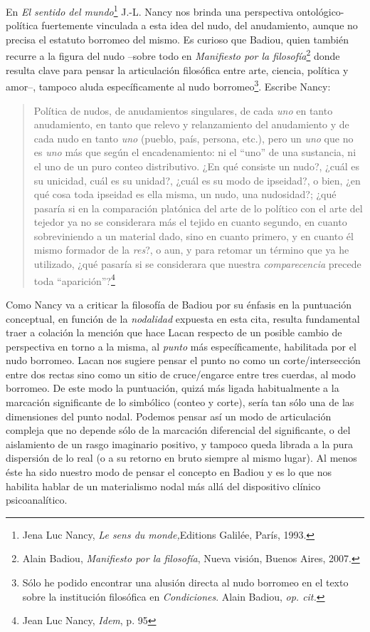 \documentclass{book}
\begin{document}
En \emph{El sentido del mundo}\footnote{Jena Luc Nancy, \emph{Le sens du
  monde,}Editions Galilée, París, 1993.} J.-L. Nancy nos brinda una
perspectiva ontológico-política fuertemente vinculada a esta idea del
nudo, del anudamiento, aunque no precisa el estatuto borromeo del mismo.
Es curioso que Badiou, quien también recurre a la figura del nudo
--sobre todo en \emph{Manifiesto por la filosofía}\footnote{Alain
  Badiou, \emph{Manifiesto por la filosofía}, Nueva visión, Buenos
  Aires, 2007.} donde resulta clave para pensar la articulación
filosófica entre arte, ciencia, política y amor--, tampoco aluda
específicamente al nudo borromeo\footnote{Sólo he podido encontrar una
  alusión directa al nudo borromeo en el texto sobre la institución
  filosófica en \emph{Condiciones}. Alain Badiou, \emph{op. cit.}}.
Escribe Nancy:

\begin{quote}
Política de nudos, de anudamientos singulares, de cada \emph{uno} en
tanto anudamiento, en tanto que relevo y relanzamiento del anudamiento y
de cada nudo en tanto \emph{uno} (pueblo, país, persona, etc.), pero un
\emph{uno} que no es \emph{uno} más que según el encadenamiento: ni el
``uno'' de una sustancia, ni el uno de un puro conteo distributivo. ¿En
qué consiste un nudo?, ¿cuál es su unicidad, cuál es su unidad?, ¿cuál
es su modo de ipseidad?, o bien, ¿en qué cosa toda ipseidad es ella
misma, un nudo, una nudosidad?; ¿qué pasaría si en la comparación
platónica del arte de lo político con el arte del tejedor ya no se
considerara más el tejido en cuanto segundo, en cuanto sobreviniendo a
un material dado, sino en cuanto primero, y en cuanto él mismo formador
de la \emph{res}?, o aun, y para retomar un término que ya he utilizado,
¿qué pasaría si se considerara que nuestra \emph{comparecencia} precede
toda ``aparición''?\footnote{Jean Luc Nancy, \emph{Idem}, p. 95}
\end{quote}

Como Nancy va a criticar la filosofía de Badiou por su énfasis en la
puntuación conceptual, en función de la \emph{nodalidad} expuesta en
esta cita, resulta fundamental traer a colación la mención que hace
Lacan respecto de un posible cambio de perspectiva en torno a la misma,
al \emph{punto} más específicamente, habilitada por el nudo borromeo.
Lacan nos sugiere pensar el punto no como un corte/intersección entre
dos rectas sino como un sitio de cruce/engarce entre tres cuerdas, al
modo borromeo. De este modo la puntuación, quizá más ligada
habitualmente a la marcación significante de lo simbólico (conteo y
corte), sería tan sólo una de las dimensiones del punto nodal. Podemos
pensar así un modo de articulación compleja que no depende sólo de la
marcación diferencial del significante, o del aislamiento de un rasgo
imaginario positivo, y tampoco queda librada a la pura dispersión de lo
real (o a su retorno en bruto siempre al mismo lugar). Al menos éste ha
sido nuestro modo de pensar el concepto en Badiou y es lo que nos
habilita hablar de un materialismo nodal más allá del dispositivo
clínico psicoanalítico.
\end{document}
